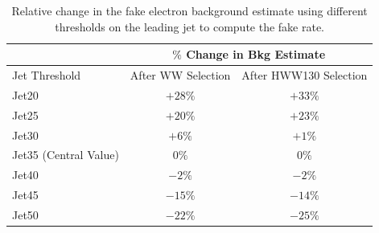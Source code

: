 \begin{table}[!htbp]
\begin{center}
\begin{tabular}{|l|c|c|}
\hline
                        & \multicolumn{2}{|c|}{ $\%$ Change in Bkg Estimate} \\
\hline
Jet Threshold           & After WW Selection  & After HWW130 Selection \\
\hline
Jet20                   &  $+28\%$     & $+33\%$    \\
Jet25                   &  $+20\%$     & $+23\%$    \\
Jet30                   &  $+6\%$      & $+1\%$     \\
Jet35 (Central Value)   &  $0\%$       & $0\%$      \\
Jet40                   &  $-2\%$      & $-2\%$     \\
Jet45                   &  $-15\%$     & $-14\%$    \\
Jet50                   &  $-22\%$     & $-25\%$    \\
\hline

\hline
\end{tabular}
\caption{Relative change in the fake electron background estimate using different thresholds on the leading jet to compute the fake rate. }
\label{tab:ele_fr_JetSpectrumSystematics}
\end{center}
\end{table}






